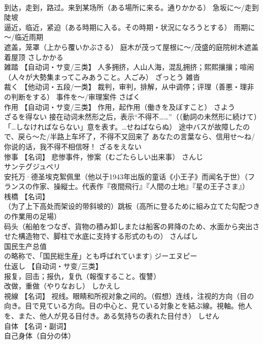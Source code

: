 \documentclass[8pt]{extreport}
\begin{document}
\begin{CJK}{UTF8}{min}
\\	到达，走到，路过。来到某场所（ある場所に来る。通りかかる） 急坂に～/走到陡坡 
\\	逼近，临近，紧迫（ある時期に入る。その時期・状況になろうとする） 雨期に～/临近雨期 
\\	遮盖，笼罩（上から覆いかぶさる） 庭木が茂って屋根に～/茂盛的庭院树木遮盖着屋顶	さしかかる	
\\	雑踏	【自动词・サ变/三类】 人多拥挤，人山人海，混乱拥挤；熙熙攘攘；喧闹（人々が大勢集まってこみあうこと。人ごみ）	ざっとう	雑沓
\\	裁く	【他动词・五段/一类】 裁判，审判，排解，从中调停；评理（善悪・理非の判断をする） 事件を～/审理案件	さばく	
\\	作用	【自动词・サ变/三类】 作用，起作用（働きを及ぼすこと）	さよう	
\\	ざるを得ない	接在动词未然形之后，表示“不得不……”（（動詞の未然形に続けて）「…しなければならない」意を表す。…せねばならぬ） 途中バスが故障したので、戻ら～た/半路上车坏了，不得不又回来了 あなたの言葉なら、信用せ～ね/你说的话，我不得不相信呀！	ざるをえない	
\\	惨事	【名词】 悲惨事件，惨案（むごたらしい出来事）	さんじ	
\\	サンテグジュペリ	
\\	安托万·德圣埃克絮佩里（他以于1943年出版的童话《小王子》而闻名于世）（フランスの作家、操縦士。代表作『夜間飛行』『人間の土地』『星の王子さま』）		
\\	桟橋	【名词】 
\\	（为了上下高处而架设的带斜坡的）跳板（高所に登るために組み立てた勾配つきの作業用の足場） 
\\	码头（船舶をつなぎ、貨物の積み卸しまたは船客の昇降のため、水面から突出させた構造物で、脚柱で水底に支持する形式のもの）	さんばし	
\\	国民生产总值
\\	の略称で、「国民総生産」とも呼ばれています)	ジーエヌピー	
\\	仕返し	【自动词・サ变/三类】 
\\	报复，回击；报仇，复仇（報復すること。復讐） 
\\	改做，重做（やりなおし）	しかえし	
\\	視線	【名词】 视线。眼睛和所视对象之间的。（假想）连线，注视的方向（目の向き。目で見ている方向。目の中心と、見ている対象とを結ぶ線。視軸。他人を、また、他人が見る目付き。ある気持ちの表れた目付き）	しせん	
\\	自体	【名词・副词】 
\\	自己身体（自分の体） 

\end{CJK}
\end{document}
